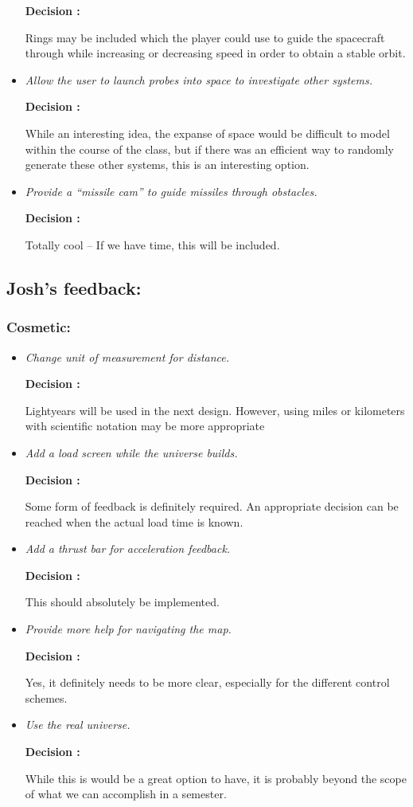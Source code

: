 \begin{itemize}
        \textbf{Decision : } \parbox[t]{5in}{Rings may be included which the player could use to guide the spacecraft through while increasing or decreasing speed in order to obtain a stable orbit.}

  \item \emph{Allow the user to launch probes into space to investigate other systems.}
        
        \textbf{Decision : } \parbox[t]{5in}{While an interesting idea, the expanse of space would be difficult to model within the course of the class, but if there was an efficient way to randomly generate these other systems, this is an interesting option.}

  \item \emph{Provide a ``missile cam'' to guide missiles through obstacles.}
        
        \textbf{Decision : } \parbox[t]{5in}{Totally cool -- If we have time, this will be included.}
\end{itemize}

\subsection*{Josh's feedback:}
\subsubsection*{Cosmetic:}
\begin{itemize}
  \item \emph{Change unit of measurement for distance.}
        
        \textbf{Decision : } \parbox[t]{5in}{Lightyears will be used in the next design. However, using miles or kilometers with scientific notation may be more appropriate}

  \item \emph{Add a load screen while the universe builds.}

        \textbf{Decision : } \parbox[t]{5in}{Some form of feedback is definitely required. An appropriate decision can be reached when the actual load time is known.}

  \item \emph{Add a thrust bar for acceleration feedback.}

        \textbf{Decision : } \parbox[t]{5in}{This should absolutely be implemented.}

  \item \emph{Provide more help for navigating the map.}

        \textbf{Decision : } \parbox[t]{5in}{Yes, it definitely needs to be more clear, especially for the different control schemes.}

  \item \emph{Use the real universe.}

        \textbf{Decision : } \parbox[t]{5in}{While this is would be a great option to have, it is probably beyond the scope of what we can accomplish in a semester.}
\end{itemize}

